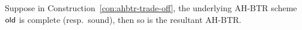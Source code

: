 \begin{theorem}\label{thm:ahbtr-trade-off}
Suppose in Construction~\ref{con:ahbtr-trade-off},
the underlying AH-BTR scheme $\OLD$ is complete (resp.~sound),
then so is the resultant AH-BTR.
\end{theorem}
